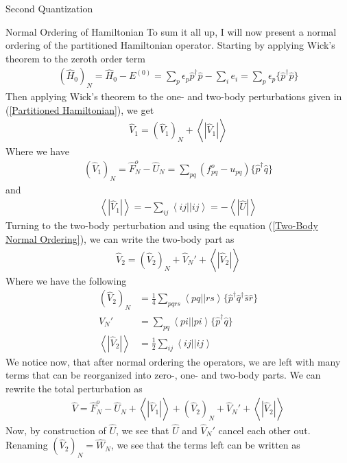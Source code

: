 \documentclass[twoside,english]{uiofysmaster}
\begin{document}
\begin{chapter}{Second Quantization}
	\begin{section}{Normal Ordering of Hamiltonian}
		To sum it all up, I will now present a normal ordering of the partitioned Hamiltonian operator. Starting by applying Wick's theorem to the zeroth order term
		\begin{align}
			(\hat H_0)_N = \hat H_0 - E^{(0)} = \sum_p \epsilon_p \hat p^\dagger \hat p - \sum_i e_i = \sum_p \epsilon_p \{\hat p^\dagger \hat p\}
		\end{align}
		Then applying Wick's theorem to the one- and two-body perturbations given in (\ref{Partitioned Hamiltonian}), we get 
		\begin{align}
			\hat V_1 = (\hat V_1)_N + \left< \right. | \hat V_1 | \left. \right>
		\end{align}
		Where we have 
		\begin{align}
			(\hat V_1)_N = \hat F_N^o - \hat U_N = \sum_{pq}(f_{pq}^o - u_{pq})\{ \hat p^\dagger \hat q \}
		\end{align}
		and
		\begin{align}
			\left< \right. | \hat V_1 | \left. \right> = -\sum_{ij} \left< ij || ij \right> = - \left< \right. | \hat U | \left. \right> 
		\end{align}
		Turning to the two-body perturbation and using the equation (\ref{Two-Body Normal Ordering}), we can write the two-body part as
		\begin{align}
			\hat V_2 = (\hat V_2)_N + \hat V_N' + \left< \right. | \hat V_2 | \left. \right>
		\end{align}
		Where we have the following 
		\begin{align}
			(\hat V_2)_N &= \frac{1}{4} \sum_{pqrs} \left<pq||rs\right> \{ \hat p^\dagger \hat q^\dagger \hat s \hat r \} \\
			V_N' &= \sum_{pq} \left<pi||pi\right> \{ \hat p^\dagger \hat q \} \\
			\left< \right. | \hat V_2 | \left. \right> &= \frac{1}{2} \sum_{ij} \left<ij||ij\right>
		\end{align}
		We notice now, that after normal ordering the operators, we are left with many terms that can be reorganized into zero-, one- and two-body parts. We can rewrite the total perturbation as
		\begin{align}
			\hat V = \hat F_N^o - \hat U_N + \left< \right. | \hat V_1 | \left. \right> + (\hat V_2)_N + \hat V_N' + \left< \right. | \hat V_2 | \left. \right>
			\label{Total Perturbation}
		\end{align}
		Now, by construction of $\hat U$, we see that $\hat U$ and $\hat V_N'$ cancel each other out. Renaming $(\hat V_2)_N = \hat W_N$, we see that the terms left can be written as 

\end{section}
\end{chapter}
\end{document}
